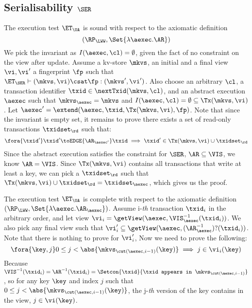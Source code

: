 \subsection{Serialisability \( \SER \)}
\label{sec:sound-complete-ser}

The execution test $\ET_\UA$ is sound with respect to the axiomatic definition 
\[ 
    (\RP_{\LWW}, \Set{\lambda \aexec. \AR })
\]
We pick the invariant as \( I( \aexec, \cl ) = \emptyset \), given the fact of no constraint on the view after update.
Assume a kv-store $\mkvs$, an initial and a final view $\vi, \vi'$  a fingerprint $\fp$ 
such that $\ET_{\SER} \vdash (\mkvs, \vi) \csat \fp: (\mkvs',\vi')$. 
Also choose an arbitrary $\cl$, a transaction identifier $\txid \in \nextTxid(\mkvs, \cl)$, 
and an abstract execution $\aexec$ such that $\mkvs_{\aexec} = \mkvs$ and 
\( I(\aexec, \cl) =  \emptyset \subseteq \Tx(\mkvs, \vi) \).
Let \( \aexec' = \extend(\aexec, \txid, \Tx(\mkvs, \vi), \fp ) \).
Note that since the invariant is empty set, it remains to prove there exists a set of read-only transactions \( \txidset_\rd \) such that:
\[
    \begin{array}{@{}l@{}}
        \fora{ \txid' } 
        \txid' \toEDGE{\AR_{\aexec'}} \txid \implies \txid' \in \Tx(\mkvs, \vi) \cup \txidset_\rd
    \end{array}
\]
Since the abstract execution satisfies the constraint for \( \SER \), \ie \( \AR \subseteq \VIS \), we know \( \AR = \VIS \).
Since \( \Tx(\mkvs, \vi)  \) contains all transactions that write at least a key, 
we can pick a \( \txidset_\rd \) such that \( \Tx(\mkvs, \vi) \cup \txidset_\rd = \txidset_\aexec\),
which gives us the proof.


The execution test $\ET_\UA$ is complete with respect to the axiomatic definition \( (\RP_{\LWW}, \Set{\lambda \aexec. \AR_\aexec }) \).
Assume i-\emph{th} transaction \( \txid_i \) in the arbitrary order,
and let view \( \vi_{i} = \getView(\aexec, \VIS^{-1}_{\aexec}(\txid_{i}) ) \).
We also pick any final view such that \( \vi'_{i} \subseteq \getView(\aexec, (\AR^{-1}_{\aexec})?(\txid_{i}) ) \).
Note that there is nothing to prove for \( \vi'_i \),
Now we need to prove the following:
\[
    \fora{\key, j}  0 \leq j < \abs{\mkvs_{\cut(\aexec, i-1)}(\key)} \implies j \in \vi_i(\key)
\]
Because \( \VIS^{-1}(\txid_i) = \AR^{-1}(\txid_i) = \Setcon{\txid }{\txid \texttt{ appears in } \mkvs_{\cut(\aexec, i-1)} }\),
so for any key \( \key \) and index \( j \) such that \( 0 \leq j < \abs{\mkvs_{\cut(\aexec, i-1)}(\key)} \),
the j-\emph{th} version of the key contains in the view, \ie \( j \in \vi(\key)\).


